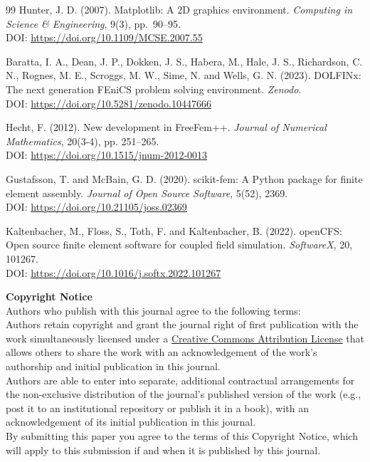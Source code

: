 \documentclass{jors}
\begin{document}
\begin{thebibliography}{99}
Hunter, J. D. (2007).
Matplotlib: A 2D graphics environment.
\textit{Computing in Science \& Engineering}, 9(3), pp.~90--95.\\
DOI: \url{https://doi.org/10.1109/MCSE.2007.55}

Baratta, I. A., Dean, J. P., Dokken, J. S., Habera, M., Hale, J. S.,
Richardson, C. N., Rognes, M. E., Scroggs, M. W., Sime, N. and Wells, G. N. (2023).
DOLFINx: The next generation FEniCS problem solving environment.
\textit{Zenodo}.\\
DOI: \url{https://doi.org/10.5281/zenodo.10447666}

Hecht, F. (2012).
New development in FreeFem++.
\textit{Journal of Numerical Mathematics}, 20(3-4), pp. 251--265.\\
DOI: \url{https://doi.org/10.1515/jnum-2012-0013}

Gustafsson, T. and McBain, G. D. (2020).
scikit-fem: A Python package for finite element assembly.
\textit{Journal of Open Source Software}, 5(52), 2369.\\
DOI: \url{https://doi.org/10.21105/joss.02369}

Kaltenbacher, M., Floss, S., Toth, F. and Kaltenbacher, B. (2022).
openCFS: Open source finite element software for coupled field simulation.
\textit{SoftwareX}, 20, 101267.\\
DOI: \url{https://doi.org/10.1016/j.softx.2022.101267}

\end{thebibliography}

{ \bf Copyright Notice} \\
Authors who publish with this journal agree to the following terms: \\

Authors retain copyright and grant the journal right of first publication with the work simultaneously licensed under a  \href{http://creativecommons.org/licenses/by/3.0/}{Creative Commons Attribution License} that allows others to share the work with an acknowledgement of the work's authorship and initial publication in this journal. \\

Authors are able to enter into separate, additional contractual arrangements for the non-exclusive distribution of the journal's published version of the work (e.g., post it to an institutional repository or publish it in a book), with an acknowledgement of its initial publication in this journal. \\

By submitting this paper you agree to the terms of this Copyright Notice, which will apply to this submission if and when it is published by this journal.
\end{document}
